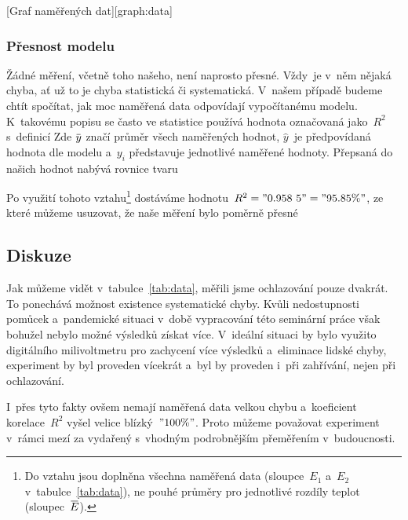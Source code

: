 [Graf naměřených dat][graph:data]

\subsubsection{Přesnost modelu}
\label{sec:presnost}
Žádné měření, včetně toho našeho, není naprosto přesné. Vždy~je v~něm nějaká chyba,
ať už to je chyba statistická či systematická. V~našem případě budeme chtít 
spočítat, jak moc naměřená data odpovídají vypočítanému modelu. K~takovému
popisu se často ve statistice používá hodnota označovaná jako~$R^2$ s~definicí
Zde $\avg y$ značí průměr všech naměřených hodnot, $\hat y$~je předpovídaná
hodnota dle modelu a~$y_i$ představuje jednotlivé naměřené hodnoty. Přepsaná do
našich hodnot nabývá rovnice tvaru

Po využití tohoto vztahu\footnote{Do vztahu jsou doplněna všechna naměřená data
(sloupce~$E_1$ a~$E_2$ v~tabulce~\ref{tab:data}), ne pouhé průměry pro
jednotlivé rozdíly teplot (sloupec~$\avg{E}$).} dostáváme 
hodnotu~$R^2 = "0.958~5" = "95.85 \%"$, ze které můžeme usuzovat, že naše 
měření bylo poměrně přesné

\subsection{Diskuze}
Jak můžeme vidět v~tabulce~\ref{tab:data}, měřili jsme ochlazování pouze
dvakrát. To ponechává možnost existence systematické chyby. Kvůli nedostupnosti
pomůcek a~pandemické situaci v~době vypracování této seminární práce však
bohužel nebylo možné výsledků získat více. V~ideální situaci by bylo využito
digitálního milivoltmetru pro zachycení více výsledků a~eliminace lidské chyby,
experiment by byl proveden vícekrát a~byl by proveden i~při zahřívání, nejen
při ochlazování.

I~přes tyto fakty ovšem nemají naměřená data velkou chybu a~koeficient
korelace~$R^2$ vyšel velice blízký~$"100 \%"$. Proto můžeme považovat
experiment v~rámci mezí za vydařený s~vhodným podrobnějším přeměřením
v~budoucnosti.
